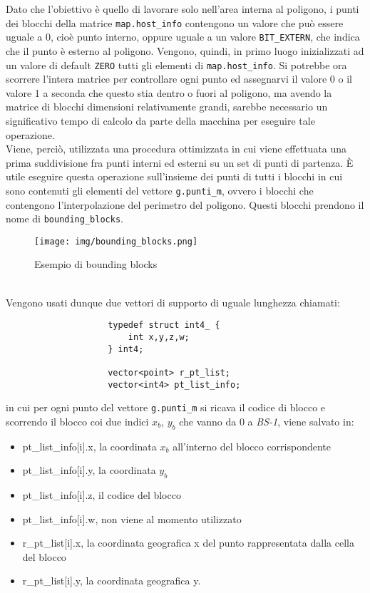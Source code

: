 				Dato che l'obiettivo \`{e} quello di lavorare solo nell'area interna al poligono, i punti dei blocchi della matrice \texttt{map.host\_info} contengono un valore che pu\`{o} essere uguale a 0, cio\`{e} punto interno, oppure uguale a un valore \texttt{BIT\_EXTERN}, che indica che il punto \`{e} esterno al poligono. Vengono, quindi, in primo luogo inizializzati ad un valore di default \texttt{ZERO} tutti gli elementi di \texttt{map.host\_info}. Si potrebbe ora scorrere l'intera matrice per controllare ogni punto ed assegnarvi il valore 0 o il valore 1 a seconda che questo stia dentro o fuori al poligono, ma avendo la matrice di blocchi dimensioni relativamente grandi, sarebbe necessario un significativo tempo di calcolo da parte della macchina per eseguire tale operazione.\\
				Viene, perci\`{o}, utilizzata una procedura ottimizzata in cui viene effettuata una prima suddivisione fra punti interni ed esterni su un set di punti di partenza. \`{E} utile eseguire questa operazione sull'insieme dei punti di tutti i blocchi in cui sono contenuti gli elementi del vettore \texttt{g.punti\_m}, ovvero i blocchi che contengono l'interpolazione del perimetro del poligono. Questi blocchi prendono il nome di \texttt{bounding\_blocks}.		
				\begin{figure}[!htbp]
					\centering
					\texttt{[image: img/bounding\_blocks.png]}
					\caption{Esempio di bounding blocks}
				\end{figure}\\
				Vengono usati dunque due vettori di supporto di uguale lunghezza chiamati: 
				\begin{verbatim}
					typedef struct int4_ {
					    int x,y,z,w;
					} int4;

					vector<point> r_pt_list;
					vector<int4> pt_list_info;
				\end{verbatim}  
				in cui per ogni punto del vettore \texttt{g.punti\_m} si ricava il codice di blocco e scorrendo il blocco coi due indici $x_b$, $y_b$ che vanno da 0 a \textit{BS-1}, viene salvato in:
				\begin{itemize}
					\item pt\_list\_info[i].x, la coordinata $x_b$ all'interno del blocco corrispondente
					\item pt\_list\_info[i].y, la coordinata $y_b$
					\item pt\_list\_info[i].z, il codice del blocco
					\item pt\_list\_info[i].w, non viene al momento utilizzato
					\item r\_pt\_list[i].x, la coordinata geografica x del punto rappresentata dalla cella del blocco
					\item r\_pt\_list[i].y, la coordinata geografica y. 
				\end{itemize}
